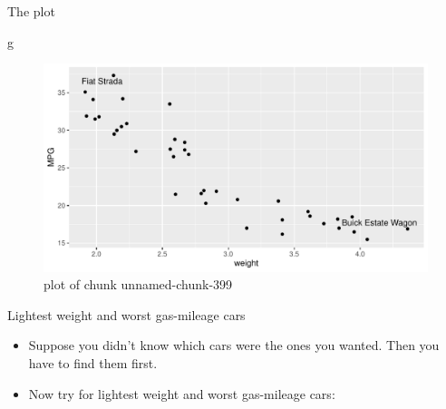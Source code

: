 \documentclass[ignorenonframetext,]{beamer}
\newenvironment{Shaded}{\begin{snugshade}}{\end{snugshade}}
\newcommand{\DataTypeTok}[1]{\textcolor[rgb]{0.13,0.29,0.53}{#1}}
\newcommand{\KeywordTok}[1]{\textcolor[rgb]{0.13,0.29,0.53}{\textbf{#1}}}
\newcommand{\NormalTok}[1]{#1}
\newcommand{\OperatorTok}[1]{\textcolor[rgb]{0.81,0.36,0.00}{\textbf{#1}}}
\newcommand{\StringTok}[1]{\textcolor[rgb]{0.31,0.60,0.02}{#1}}
\providecommand{\tightlist}{%
  \setlength{\itemsep}{0pt}\setlength{\parskip}{0pt}}
\begin{document}
\begin{frame}[fragile]{The plot}
\protect\hypertarget{the-plot-6}{}

\begin{Shaded}
\begin{Highlighting}[]
\NormalTok{g}
\end{Highlighting}
\end{Shaded}

\begin{figure}
\centering
\includegraphics{figure/unnamed-chunk-399-1.pdf}
\caption{plot of chunk unnamed-chunk-399}
\end{figure}

\end{frame}

\begin{frame}[fragile]{Lightest weight and worst gas-mileage cars}
\protect\hypertarget{lightest-weight-and-worst-gas-mileage-cars}{}

\begin{itemize}
\tightlist
\item
  Suppose you didn't know which cars were the ones you wanted. Then you
  have to find them first.
\item
  Now try for lightest weight and worst gas-mileage cars:
\end{itemize}

\begin{Shaded}
\end{Shaded}

\end{frame}
\end{document}
